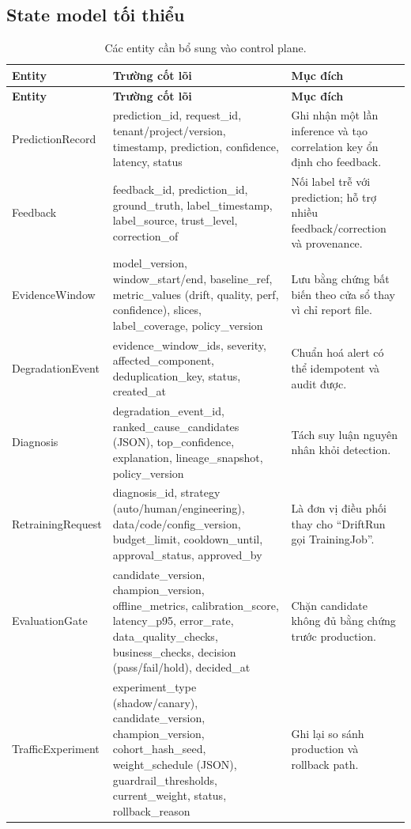 \documentclass[11pt,a4paper]{article}
\begin{document}
\subsection{State model tối thiểu}
\begin{longtable}{@{}P{3.2cm}P{4.6cm}P{5.1cm}@{}}
\caption{Các entity cần bổ sung vào control plane.}\\
\toprule
\textbf{Entity} & \textbf{Trường cốt lõi} & \textbf{Mục đích} \\
\midrule
\endfirsthead
\toprule
\textbf{Entity} & \textbf{Trường cốt lõi} & \textbf{Mục đích} \\
\midrule
\endhead
PredictionRecord & prediction\_id, request\_id, tenant/project/version, timestamp, prediction, confidence, latency, status & Ghi nhận một lần inference và tạo correlation key ổn định cho feedback. \\
\addlinespace
Feedback & feedback\_id, prediction\_id, ground\_truth, label\_timestamp, label\_source, trust\_level, correction\_of & Nối label trễ với prediction; hỗ trợ nhiều feedback/correction và provenance. \\
\addlinespace
EvidenceWindow & model\_version, window\_start/end, baseline\_ref, metric\_values (drift, quality, perf, confidence), slices, label\_coverage, policy\_version & Lưu bằng chứng bất biến theo cửa sổ thay vì chỉ report file. \\
\addlinespace
DegradationEvent & evidence\_window\_ids, severity, affected\_component, deduplication\_key, status, created\_at & Chuẩn hoá alert có thể idempotent và audit được. \\
\addlinespace
Diagnosis & degradation\_event\_id, ranked\_cause\_candidates (JSON), top\_confidence, explanation, lineage\_snapshot, policy\_version & Tách suy luận nguyên nhân khỏi detection. \\
\addlinespace
RetrainingRequest & diagnosis\_id, strategy (auto/human/engineering), data/code/config\_version, budget\_limit, cooldown\_until, approval\_status, approved\_by & Là đơn vị điều phối thay cho ``DriftRun gọi TrainingJob''. \\
\addlinespace
EvaluationGate & candidate\_version, champion\_version, offline\_metrics, calibration\_score, latency\_p95, error\_rate, data\_quality\_checks, business\_checks, decision (pass/fail/hold), decided\_at & Chặn candidate không đủ bằng chứng trước production. \\
\addlinespace
TrafficExperiment & experiment\_type (shadow/canary), candidate\_version, champion\_version, cohort\_hash\_seed, weight\_schedule (JSON), guardrail\_thresholds, current\_weight, status, rollback\_reason & Ghi lại so sánh production và rollback path. \\
\bottomrule
\end{longtable}
\end{document}
